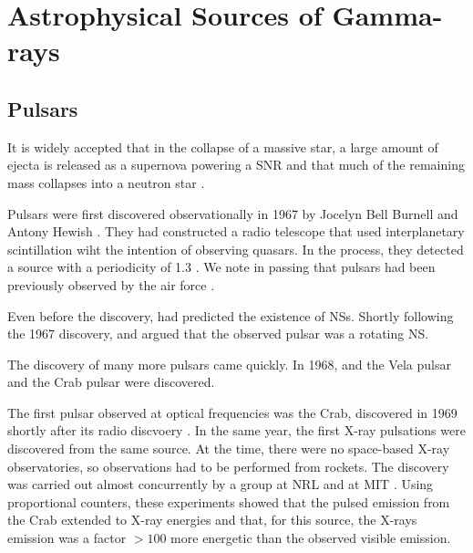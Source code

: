 \section{Astrophysical Sources of Gamma-rays}

\subsection{Pulsars}

It is widely accepted that in the collapse of a massive star, a large
amount of ejecta is released as a supernova powering a \ac{SNR}
and that much of the remaining mass collapses into a neutron star
\citep{baade_1934a_remarks-super-novae}.

Pulsars were first discovered observationally in 1967 by Jocelyn Bell
Burnell and Antony Hewish \citep{hewish_1968_observation-rapidly}. They
had constructed a radio telescope that used interplanetary scintillation
wiht the intention of observing quasars.  In the process, they
detected a source with a periodicity of 1.3 \second. We note in
passing that pulsars had been previously observed by the air force
\citep{brumfiel_2007_force-early}.

Even before the discovery, \cite{pacini_1967_energy-emission}
had predicted the existence of \acp{NS}.  Shortly following
the 1967 discovery, \cite{gold_1968_rotating-neutron} and
\cite{pacini_1968_rotating-neutron} argued that the observed pulsar was
a rotating \ac{NS}.

The discovery of many more pulsars came quickly.  In 1968, and the
Vela pulsar \citep{large_1968_pulsar-supernova} and the Crab pulsar
\citep{staelin_1968_pulsating-radio} were discovered.

The first pulsar observed at optical frequencies was the
Crab, discovered in 1969 shortly after its radio discvoery
\citep{cocke_1969_discovery-optical}.  In the same year, the first X-ray
pulsations were discovered from the same source. At the time, there were
no space-based X-ray observatories, so observations had to be performed
from rockets.  The discovery was carried out almost concurrently by
a group at \gls{NRL} \citep{fritz_1969_x-ray-pulsar} and at \gls{MIT}
\citep{bradt_1969_x-ray-optical}.  Using proportional counters, these
experiments showed that the pulsed emission from the Crab extended to
X-ray energies and that, for this source, the X-rays emission was a
factor $>100$ more energetic than the observed visible emission.

